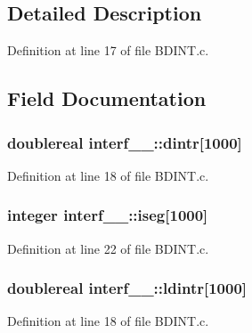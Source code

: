 \subsection{Detailed Description}


Definition at line 17 of file B\+D\+I\+N\+T.\+c.



\subsection{Field Documentation}
\subsubsection[{\texorpdfstring{dintr}{dintr}}]{\setlength{\rightskip}{0pt plus 5cm}doublereal interf\+\_\+\_\+\+::dintr\mbox{[}1000\mbox{]}}\hypertarget{structinterf__1___af5f138bef0bd2ea5e6a5376ef5cac971}{}\label{structinterf__1___af5f138bef0bd2ea5e6a5376ef5cac971}


Definition at line 18 of file B\+D\+I\+N\+T.\+c.

\subsubsection[{\texorpdfstring{iseg}{iseg}}]{\setlength{\rightskip}{0pt plus 5cm}integer interf\+\_\+\_\+\+::iseg\mbox{[}1000\mbox{]}}\hypertarget{structinterf__1___a9543ed85a0f65d46f5c17c303d48c71a}{}\label{structinterf__1___a9543ed85a0f65d46f5c17c303d48c71a}


Definition at line 22 of file B\+D\+I\+N\+T.\+c.

\subsubsection[{\texorpdfstring{ldintr}{ldintr}}]{\setlength{\rightskip}{0pt plus 5cm}doublereal interf\+\_\+\_\+\+::ldintr\mbox{[}1000\mbox{]}}\hypertarget{structinterf__1___a023732e5c1db84b6c0af1e27f0b0a3ac}{}\label{structinterf__1___a023732e5c1db84b6c0af1e27f0b0a3ac}


Definition at line 18 of file B\+D\+I\+N\+T.\+c.


